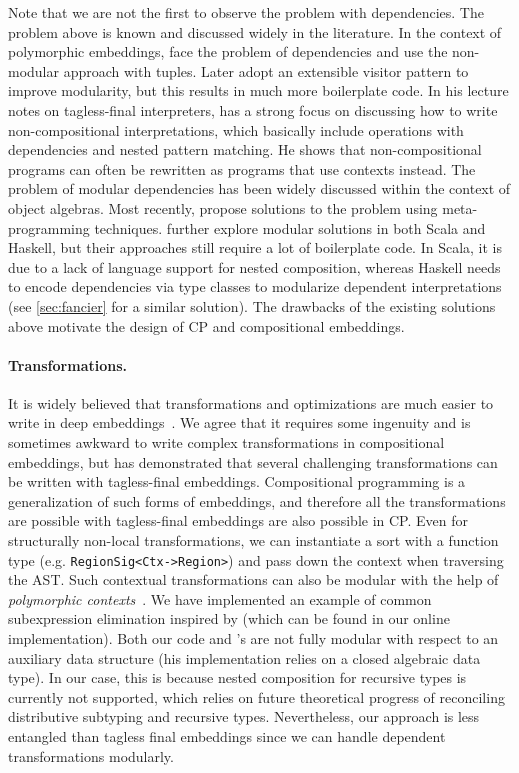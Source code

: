 Note that we are not the first to observe the problem with dependencies. The
problem above is known and discussed widely in the literature. In the context of
polymorphic embeddings, \citet{hofer2008polymorphic} face the problem of
dependencies and use the non-modular approach with tuples. Later
\citet{hofer2010modular} adopt an extensible visitor pattern to improve
modularity, but this results in much more boilerplate code. In his lecture notes
on tagless-final interpreters, \citet{kiselyov2010typed} has a strong focus on
discussing how to write non-compositional interpretations, which basically
include operations with dependencies and nested pattern matching. He shows that
non-compositional programs can often be rewritten as programs that use contexts
instead. The problem of modular dependencies has been widely discussed within
the context of object algebras. Most recently,
\citet{zhang2017evf,zhang2020castor} propose solutions to the problem using
meta-programming techniques. \citet{zhang2019shallow} further explore modular
solutions in both Scala and Haskell, but their approaches still require a lot of
boilerplate code. In Scala, it is due to a lack of language support for nested
composition, whereas Haskell needs to encode dependencies via type classes to
modularize dependent interpretations (see \autoref{sec:fancier} for a similar
solution). The drawbacks of the existing solutions above motivate the design of
CP and compositional embeddings.

\paragraph{Transformations.}
It is widely believed that transformations and optimizations are much easier to
write in deep embeddings~\citep{jovanovic2014yinyang,scherr2014implicit}. We
agree that it requires some ingenuity and is sometimes awkward to write complex
transformations in compositional embeddings, but \citet{kiselyov2010typed} has
demonstrated that several challenging transformations can be written with
tagless-final embeddings. Compositional programming is a generalization of such
forms of embeddings, and therefore all the transformations are possible with
tagless-final embeddings are also possible in CP. Even for structurally
non-local transformations, we can instantiate a sort with a function type (e.g.
\lstinline{RegionSig<Ctx->Region>}) and pass down the context when traversing
the AST. Such contextual transformations can also be modular with the help of
\emph{polymorphic contexts}~\citep{zhang2021compositional}. We have implemented
an example of common subexpression elimination inspired by
\citet{kiselyov2011implementing} (which can be found in our online
implementation). Both our code and \citeauthor{kiselyov2011implementing}'s are
not fully modular with respect to an auxiliary data structure (his
implementation relies on a closed algebraic data type). In our case, this is
because nested composition for recursive types is currently not supported, which
relies on future theoretical progress of reconciling distributive subtyping and
recursive types. Nevertheless, our approach is less entangled than tagless final
embeddings since we can handle dependent transformations modularly.
